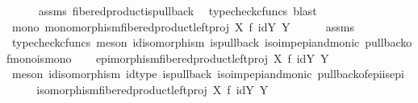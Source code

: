 \begin{isabellebody}
\ \ \ \ \isamarkupfalse%
\ assms\ fibered{\isacharunderscore}{\kern0pt}product{\isacharunderscore}{\kern0pt}is{\isacharunderscore}{\kern0pt}pullback\ \isamarkupfalse%
\ {\isacharparenleft}{\kern0pt}typecheck{\isacharunderscore}{\kern0pt}cfuncs{\isacharcomma}{\kern0pt}\ blast{\isacharparenright}{\kern0pt}\isanewline
\ \ \ \ \isanewline
\ \ \isamarkupfalse%
\ \isamarkupfalse%
\ mono{\isacharcolon}{\kern0pt}\ {\isachardoublequoteopen}monomorphism{\isacharparenleft}{\kern0pt}fibered{\isacharunderscore}{\kern0pt}product{\isacharunderscore}{\kern0pt}left{\isacharunderscore}{\kern0pt}proj\ X\ f\ {\isacharparenleft}{\kern0pt}id{\isacharparenleft}{\kern0pt}Y{\isacharparenright}{\kern0pt}{\isacharparenright}{\kern0pt}\ Y{\isacharparenright}{\kern0pt}{\isachardoublequoteclose}\isanewline
\ \ \ \ \isamarkupfalse%
\ assms\ \isamarkupfalse%
\ {\isacharparenleft}{\kern0pt}typecheck{\isacharunderscore}{\kern0pt}cfuncs{\isacharcomma}{\kern0pt}\ meson\ id{\isacharunderscore}{\kern0pt}isomorphism\ is{\isacharunderscore}{\kern0pt}pullback\ iso{\isacharunderscore}{\kern0pt}imp{\isacharunderscore}{\kern0pt}epi{\isacharunderscore}{\kern0pt}and{\isacharunderscore}{\kern0pt}monic\ pullback{\isacharunderscore}{\kern0pt}of{\isacharunderscore}{\kern0pt}mono{\isacharunderscore}{\kern0pt}is{\isacharunderscore}{\kern0pt}mono{}{\isacharparenright}{\kern0pt}\isanewline
\ \ \isamarkupfalse%
\ {\isachardoublequoteopen}epimorphism{\isacharparenleft}{\kern0pt}fibered{\isacharunderscore}{\kern0pt}product{\isacharunderscore}{\kern0pt}left{\isacharunderscore}{\kern0pt}proj\ X\ f\ {\isacharparenleft}{\kern0pt}id{\isacharparenleft}{\kern0pt}Y{\isacharparenright}{\kern0pt}{\isacharparenright}{\kern0pt}\ Y{\isacharparenright}{\kern0pt}{\isachardoublequoteclose}\isanewline
\ \ \ \ \isamarkupfalse%
\ {\isacharparenleft}{\kern0pt}meson\ id{\isacharunderscore}{\kern0pt}isomorphism\ id{\isacharunderscore}{\kern0pt}type\ is{\isacharunderscore}{\kern0pt}pullback\ iso{\isacharunderscore}{\kern0pt}imp{\isacharunderscore}{\kern0pt}epi{\isacharunderscore}{\kern0pt}and{\isacharunderscore}{\kern0pt}monic\ pullback{\isacharunderscore}{\kern0pt}of{\isacharunderscore}{\kern0pt}epi{\isacharunderscore}{\kern0pt}is{\isacharunderscore}{\kern0pt}epi{}{\isacharparenright}{\kern0pt}\isanewline
\ \ \isamarkupfalse%
\ \isamarkupfalse%
\ {\isachardoublequoteopen}isomorphism{\isacharparenleft}{\kern0pt}fibered{\isacharunderscore}{\kern0pt}product{\isacharunderscore}{\kern0pt}left{\isacharunderscore}{\kern0pt}proj\ X\ f\ {\isacharparenleft}{\kern0pt}id{\isacharparenleft}{\kern0pt}Y{\isacharparenright}{\kern0pt}{\isacharparenright}{\kern0pt}\ Y{\isacharparenright}{\kern0pt}{\isachardoublequoteclose}\isanewline

\end{isabellebody}
